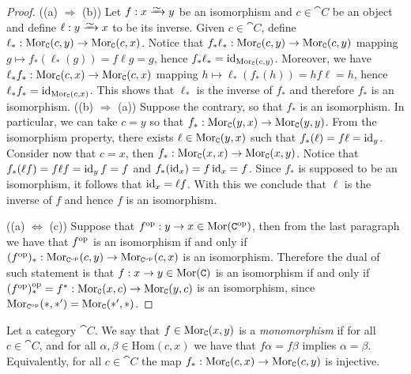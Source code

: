 \begin{proof}
  ((a) \(\Rightarrow\) (b)) Let \(f: x \isoto y\) be an isomorphism and \(c
  \in \cat C\) be an object and define \(\ell : y \isoto x\) to be its inverse.
  Given \(c \in \cat C\), define \(\ell_*: \operatorname{Mor}_{\texttt C}(c, y) \to \operatorname{Mor}_{\texttt
  C}(c, x)\). Notice that \(f_* \ell_* : \operatorname{Mor}_{\texttt C}(c, y) \to
  \operatorname{Mor}_{\texttt C}(c, y)\) mapping \(g \mapsto f_*(\ell_*(g)) = f \ell
  g = g\), hence \(f_* \ell_* = \operatorname{id}_{\operatorname{Mor}_{\texttt C}(c, y)}\). Moreover, we
  have \(\ell_* f_* : \operatorname{Mor}_{\texttt C}(c, x) \to \operatorname{Mor}_{\texttt C}(c, x)\) mapping \(h \mapsto
\ell_*(f_*(h)) = h f \ell = h\), hence
  \(\ell_* f_* = \operatorname{id}_{\operatorname{Mor}_{\texttt C}(c, x)}\). This shows that \(\ell_*\)
  is the inverse of \(f_*\) and therefore \(f_*\) is an isomorphism. ((b)
  \(\Rightarrow\) (a)) Suppose the contrary, so that \(f_*\) is an isomorphism.
  In particular, we can take \(c = y\) so that \(f_*: \operatorname{Mor}_{\texttt C}(y, x) \to
  \operatorname{Mor}_{\texttt C}(y, y)\). From the isomorphism property, there exists \(\ell \in
  \operatorname{Mor}_{\texttt C}(y, x)\) such that \(f_*(\ell) = f \ell = \operatorname{id}_y\). Consider
  now that \(c = x\), then \(f_*: \operatorname{Mor}_{\texttt C}(x, x) \to \operatorname{Mor}_{\texttt C}(x, y)\).
  Notice that \(f_*(\ell f) = f \ell f = \operatorname{id}_y f = f\)
  and \(f_*(\operatorname{id}_x) = f \operatorname{id}_x = f\). Since \(f_*\) is supposed to be an
  isomorphism, it follows that \(\operatorname{id}_x = \ell f\). With this we conclude
  that \(\ell\) is the inverse of \(f\) and hence \(f\) is an isomorphism.

  ((a) \(\Leftrightarrow\) (c)) Suppose that
  \(f^{\mathrm{op}}: y \to x \in \operatorname{Mor}(\texttt C^{\mathrm{op}})\), then from the last paragraph we have
  that \(f^{\mathrm{op}}\) is an isomorphism if and only if
  \((f^{\mathrm{op}})_* : \operatorname{Mor}_{\texttt C^{\mathrm{op}}}(c, y) \to \operatorname{Mor}_{\texttt C^{\mathrm{op}}}(c, x)\) is an
  isomorphism. Therefore the dual of such statement is that
  \(f: x \to y \in \operatorname{Mor}(\texttt C)\) is an isomorphism if and only if
  \((f^{\mathrm{op}})_*^{\mathrm{op}} = f^*: \operatorname{Mor}_{\texttt C}(x, c) \to \operatorname{Mor}_{\texttt C}(y, c)\) is an
  isomorphism, since \(\operatorname{Mor}_{\texttt C^{\mathrm{op}}}(*, *') = \operatorname{Mor}_{\texttt C}(*', *)\).
\end{proof}

\begin{definition}[Monomorphism]\label{def: monomorphism}
  Let a category \(\cat{C}\). We say that \(f \in \operatorname{Mor}_{\texttt C}(x, y)\) is a
  \emph{monomorphism} if for all \(c \in \cat{C}\), and for all \(\alpha, \beta
  \in \mathrm{Hom}(c, x)\) we have that \(f \alpha = f \beta\) implies \(\alpha
  = \beta\). Equivalently, for all \(c \in \cat C\) the map \(f_*: \operatorname{Mor}_{\texttt
  C}(c, x) \to \operatorname{Mor}_{\texttt C}(c, y)\) is injective.
\end{definition}

